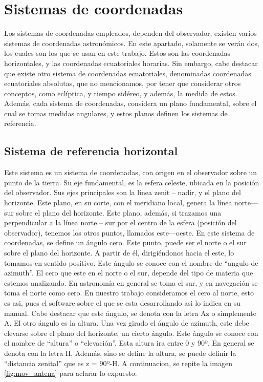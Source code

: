\section{Sistemas de coordenadas} 

Los sistemas de coordenadas empleados, dependen del observador, existen varios sistemas de coordenadas astronómicos. En este apartado, solamente se verán dos, los cuales son los que se usan en este trabajo. Estos son las coordenadas horizontales, y las coordenadas ecuatoriales horarias. Sin embargo, cabe destacar que existe otro sistema de coordenadas ecuatoriales, denominadas coordenadas ecuatoriales absolutas, que no mencionamos, por tener que considerar otros conceptos, como eclíptica, y tiempo sidéreo, y además, la medida de estos. Además, cada sistema de coordenadas, considera un plano fundamental, sobre el cual se tomas medidas angulares, y estos planos definen los sistemas de referencia. 

\subsection{Sistema de referencia horizontal}

Este sistema es un sistema de coordenadas, con origen en el observador sobre un punto de la tierra. Su eje fundamental, es la esfera celeste, ubicada en la posición del observador. Sus ejes principales son la línea zenit – nadir, y el plano del horizonte. Este plano, en su corte, con el meridiano local, genera la línea norte—sur sobre el plano del horizonte. Este plano, además, si trazamos una perpendicular a la línea norte – sur por el centro de la esfera (posición del observador), tenemos los otros puntos, llamados este—oeste. 
En este sistema de coordenadas, se define un ángulo cero. Este punto, puede ser el norte o el sur sobre el plano del horizonte. A partir de él, dirigiéndonos hacia el este, lo tomamos en sentido positivo. Este ángulo se conoce con el nombre de “angulo de azimuth”. El cero que este en el norte o el sur, depende del tipo de materia que estemos analizando. En astronomía en general se toma el sur, y en navegación se toma el norte como cero. En nuestro trabajo consideramos el cero al norte, esto es asi, pues el software sobre el que se esta desarrollando asi lo indica en su manual. Cabe destacar que este ángulo, se denota con la letra Az o simplemente A.   
El otro ángulo es la altura. Una vez girado el ángulo de azimuth, este debe elevarse sobre el plano del horizonte, un cierto ángulo. Este ángulo se conoce con el nombre de “altura” o “elevación”. Esta altura ira entre 0 y 90º. En general se denota con la letra H. Además, sino se define la altura, se puede definir la “distancia zenital” que es z = 90º-H. A continuacion, se repite la imagen \ref{fig:mov_antena} para aclarar lo expuesto: 


